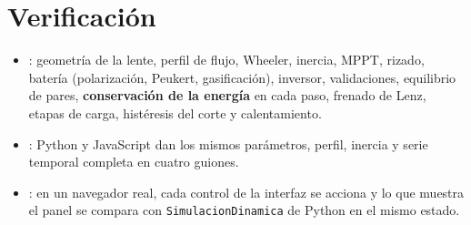 \documentclass[11pt]{article}
\begin{document}
\section{Verificación}
\begin{itemize}
  \item {}: geometría de la lente, perfil de flujo, Wheeler, inercia, MPPT,
        rizado, batería (polarización, Peukert, gasificación), inversor, validaciones, equilibrio de pares,
        \textbf{conservación de la energía} en cada paso, frenado de Lenz, etapas de carga, histéresis del corte y
        calentamiento.
  \item {}: Python y JavaScript dan los mismos parámetros, perfil,
        inercia y serie temporal completa en cuatro guiones.
  \item {}: en un navegador real, cada control de la interfaz se acciona
        y lo que muestra el panel se compara con \texttt{SimulacionDinamica} de Python en el mismo estado.
\end{itemize}
\end{document}
